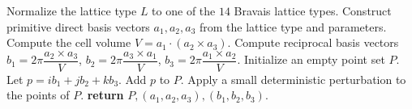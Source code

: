 \documentclass{article}
\begin{document}
\begin{algorithm}
    \caption{Setting Up a Reciprocal Lattice \\\hspace*{1em}\textbf{Input:} A Bravais lattice type $L$, lattice parameters $a,b,c,\alpha,\beta,\gamma$, and an index range $r$.\\\hspace*{1em}\textbf{Output:} A finite reciprocal lattice point set $P$, together with direct basis vectors $a_1,a_2,a_3$ and reciprocal basis vectors $b_1,b_2,b_3$.}
    \label{alg:setup_reciprocal_lattice}
    \begin{algorithmic}[1]
            \State Normalize the lattice type $L$ to one of the $14$ Bravais lattice types.
            \State Construct primitive direct basis vectors $a_1,a_2,a_3$ from the lattice type and parameters.
            \State Compute the cell volume $V = a_1 \cdot (a_2 \times a_3)$.
            \State Compute reciprocal basis vectors
            \State $b_1 = 2\pi \dfrac{a_2 \times a_3}{V}$, $b_2 = 2\pi \dfrac{a_3 \times a_1}{V}$, $b_3 = 2\pi \dfrac{a_1 \times a_2}{V}$.
            \State Initialize an empty point set $P$.
                        \State Let $p = i b_1 + j b_2 + k b_3$.
                        \State Add $p$ to $P$.
                    \EndFor
                \EndFor
            \EndFor
            \State Apply a small deterministic perturbation to the points of $P$.
            \State \textbf{return} $P, (a_1,a_2,a_3), (b_1,b_2,b_3)$.
        \EndProcedure
    \end{algorithmic}
    \end{algorithm}
\end{document}
